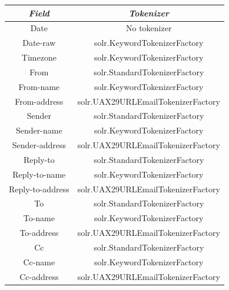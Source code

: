 \documentclass[a4paper,english]{report}
\begin{document}
\begin{center}
 \begin{tabular}{||c c||} 
 \hline
 \textit{Field} & \textit{Tokenizer} \\ [1ex] 
 \hline\hline
 Date & No tokenizer\\ 

 \hline
 Date-raw &  solr.KeywordTokenizerFactory\\

\hline
Timezone & solr.KeywordTokenizerFactory\\

\hline 
From & solr.StandardTokenizerFactory\\

\hline
From-name & solr.KeywordTokenizerFactory\\

\hline
From-address & solr.UAX29URLEmailTokenizerFactory\\

\hline 
Sender & solr.StandardTokenizerFactory\\

\hline
Sender-name & solr.KeywordTokenizerFactory\\

\hline
Sender-address & solr.UAX29URLEmailTokenizerFactory\\

\hline 
Reply-to & solr.StandardTokenizerFactory\\

\hline
Reply-to-name & solr.KeywordTokenizerFactory\\

\hline
Reply-to-address & solr.UAX29URLEmailTokenizerFactory\\

\hline 
To & solr.StandardTokenizerFactory\\

\hline
To-name & solr.KeywordTokenizerFactory\\

\hline
To-address & solr.UAX29URLEmailTokenizerFactory\\

\hline 
Cc & solr.StandardTokenizerFactory\\

\hline
Cc-name & solr.KeywordTokenizerFactory\\

\hline
Cc-address & solr.UAX29URLEmailTokenizerFactory\\


\end{tabular}
\end{center}
\end{document}
